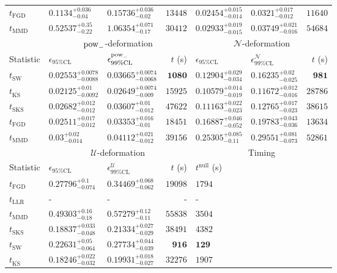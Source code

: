 \begin{tabular}{l|llr|llr}
	$t_{\mathrm{FGD}}$ & ${\mathbf{0.1134_{-0.04}^{+0.036}}}$ & ${\mathbf{0.15736_{-0.02}^{+0.036}}}$ & $13448$ & $0.02454_{-0.014}^{+0.015}$ & $0.0321_{-0.012}^{+0.017}$ & $11640$ \\
	$t_{\mathrm{MMD}}$ & $0.52537_{-0.22}^{+0.35}$ & $1.06354_{-0.17}^{+0.071}$ & $30412$ & $0.02933_{-0.015}^{+0.019}$ & $0.03749_{-0.016}^{+0.021}$ & $54684$ \\
	\toprule
	\multicolumn{1}{c}{} & \multicolumn{3}{c}{$\rm{pow}_{-}$-deformation} & \multicolumn{3}{c}{$\mathcal{N}$-deformation} \\
	Statistic & $\epsilon_{95\%\mathrm{CL}}$ & $\epsilon^  {\rm{pow}_{-}}_{99\%\mathrm{CL}}$ & $t$ (s) & $\epsilon_{95\%\mathrm{CL}}$ & $\epsilon^    {\mathcal{N}}_{99\%\mathrm{CL}}$ & $t$ (s) \\
	\midrule
	$t_{\mathrm{SW}}$ & $0.02553_{-0.0088}^{+0.0078}$ & $0.03665_{-0.0068}^{+0.0074}$ & ${\mathbf{1080}}$ & $0.12904_{-0.034}^{+0.029}$ & $0.16235_{-0.025}^{+0.02}$ & ${\mathbf{981}}$ \\
	$t_{\overline{\mathrm{KS}}}$ & ${\mathbf{0.02125_{-0.0092}^{+0.01}}}$ & ${\mathbf{0.02649_{-0.009}^{+0.0074}}}$ & $15925$ & ${\mathbf{0.10579_{-0.019}^{+0.014}}}$ & ${\mathbf{0.11672_{-0.016}^{+0.012}}}$ & $28786$ \\
	$t_{\mathrm{SKS}}$ & $0.02682_{-0.012}^{+0.012}$ & $0.03607_{-0.012}^{+0.01}$ & $47622$ & $0.11163_{-0.023}^{+0.022}$ & $0.12765_{-0.023}^{+0.017}$ & $38615$ \\
	$t_{\mathrm{FGD}}$ & $0.02511_{-0.012}^{+0.017}$ & $0.03353_{-0.01}^{+0.016}$ & $18451$ & $0.16887_{-0.052}^{+0.046}$ & $0.19783_{-0.036}^{+0.043}$ & $13634$ \\
	$t_{\mathrm{MMD}}$ & $0.03_{-0.014}^{+0.02}$ & $0.04112_{-0.012}^{+0.021}$ & $39156$ & $0.25305_{-0.11}^{+0.085}$ & $0.29551_{-0.073}^{+0.081}$ & $52861$ \\
	\toprule
	\multicolumn{1}{c}{} & \multicolumn{3}{c}{$\mathcal{U}$-deformation} & \multicolumn{3}{c}{Timing} \\
	Statistic & $\epsilon_{95\%\mathrm{CL}}$ & $\epsilon^    {\mathcal{U}}_{99\%\mathrm{CL}}$ & $t$ (s) & $t^{\mathrm{null}}$ (s) \\
	\midrule
	$t_{\mathrm{FGD}}$ & $0.27796_{-0.074}^{+0.1}$ & $0.34469_{-0.062}^{+0.068}$ & $19098$ & $1794$ \\
	$t_{\mathrm{LLR}}$ & - & - & - & - \\
	$t_{\mathrm{MMD}}$ & $0.49303_{-0.18}^{+0.16}$ & $0.57279_{-0.11}^{+0.12}$ & $55838$ & $3504$ \\
	$t_{\mathrm{SKS}}$ & $0.18837_{-0.048}^{+0.033}$ & $0.21334_{-0.029}^{+0.027}$ & $38491$ & $4382$ \\
	$t_{\mathrm{SW}}$ & $0.22631_{-0.064}^{+0.05}$ & $0.27734_{-0.039}^{+0.044}$ & ${\mathbf{916}}$ & ${\mathbf{129}}$ \\
	$t_{\overline{\mathrm{KS}}}$ & ${\mathbf{0.18246_{-0.032}^{+0.022}}}$ & ${\mathbf{0.19931_{-0.027}^{+0.018}}}$ & $32276$ & $1907$ \\
	\bottomrule
\end{tabular}